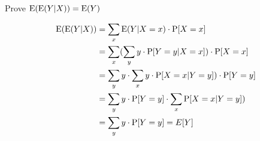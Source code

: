 \question Prove $\text{E}(\text{E}(Y|X)) = \text{E}(Y)$
\begin{solution}[2 cm]
\begin{align*}
\text{E}(\text{E}(Y|X)) &= \sum_x \text{E}(Y | X = x) \cdot \text{P}[X = x] \\
&= \sum_x (\sum_y y \cdot \text{P}[Y=y|X=x]) \cdot \text{P}[X = x] \\
&= \sum_y y \cdot  \sum_x y \cdot \text{P}[X=x|Y=y]) \cdot \text{P}[Y=y] \\
&= \sum_y y \cdot \text{P}[Y=y] \cdot \sum_x \text{P}[X=x|Y=y]) \\
&= \sum_y y \cdot \text{P}[Y=y] = E[Y]
\end{align*}
\end{solution}